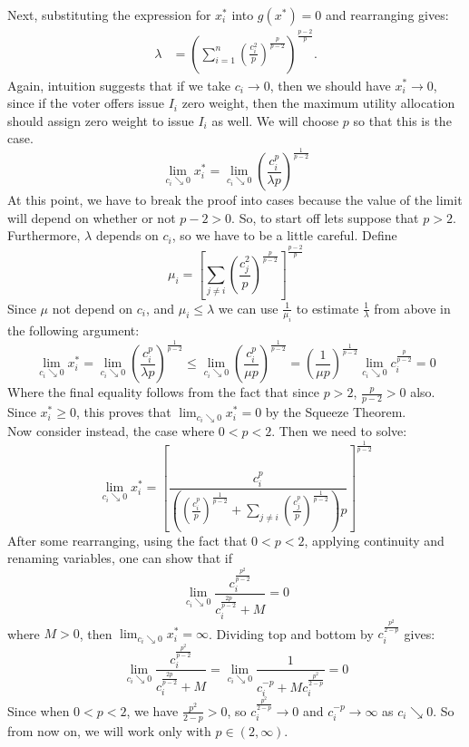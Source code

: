 \documentclass[
10pt, %
a4paper, %
oneside, %
headinclude,footinclude, %
BCOR5mm, %
]{scrartcl}
\theoremstyle{definition} %
\theoremstyle{plain} %
\theoremstyle{remark} %
\begin{document}
Next, substituting the expression for $x_i^\ast$ into $g(x^\ast) = 0$ and rearranging gives:
\begin{align*}
\lambda &= \left(\sum_{i=1}^n \left(\frac{c_i^2}{p}\right)^\frac{p}{p-2}\right)^\frac{p-2}{p}.
\end{align*}
Again, intuition suggests that if we take $c_i\to 0$, then we should have $x_i^\ast \to 0$, since if the voter offers issue $I_i$ zero weight, then the maximum utility allocation should assign zero weight to issue $I_i$ as well. We will choose $p$ so that this is the case.
$$\lim_{c_i \searrow 0} x_i^\ast = \lim_{c_i \searrow 0} \left(\frac{c_i^p}{\lambda p}\right)^{\frac{1}{p-2}}$$
At this point, we have to break the proof into cases because the value of the limit will depend on whether or not $p-2 > 0$. So, to start off lets suppose that $p > 2$. Furthermore, $\lambda$ depends on $c_i$, so we have to be a little careful. Define
$$\mu_i = \left[ \sum_{j\neq i} \left(\frac{c_j^2}{p}\right)^\frac{p}{p-2}\right]^\frac{p-2}{p}$$
Since $\mu$ not depend on $c_i$, and $\mu_i \leq \lambda$ we can use $\frac{1}{\mu_i}$ to estimate $\frac{1}{\lambda}$ from above in the following argument:
$$\lim_{c_i \searrow 0} x_i^\ast = \lim_{c_i \searrow 0} \left(\frac{c_i^p}{\lambda p}\right)^{\frac{1}{p-2}} \leq \lim_{c_i \searrow 0} \left(\frac{c_i^p}{\mu p}\right)^{\frac{1}{p-2}} = \left(\frac{1}{\mu p}\right)^\frac{1}{p-2}\lim_{c_i \searrow 0} c_i^{\frac{p}{p-2}} = 0$$
Where the final equality follows from the fact that since $p > 2$, $\frac{p}{p-2}>0$ also. Since $x_i^\ast \geq 0$, this proves that $\lim_{c_i \searrow 0} x_i^\ast = 0$ by the Squeeze Theorem. \\

Now consider instead, the case where $0<p<2$. Then we need to solve:
$$\lim_{c_i \searrow 0} x_i^\ast = \left[ \frac{c_i^p}{\left( \left(\frac{c_i^p}{p}\right)^\frac{1}{p-2} + \sum_{j\neq i}\left( \frac{c_j^p}{p}\right)^\frac{1}{p-2}\right) p} \right]^\frac{1}{p-2}$$
After some rearranging, using the fact that $0<p<2$, applying continuity and renaming variables, one can show that if
$$\lim_{c_i \searrow 0} \frac{c_i^\frac{p^2}{p-2}}{c_i^\frac{2p}{p-2} + M} = 0$$
where $M > 0$, then $\lim_{c_i \searrow 0} x_i^\ast = \infty$. Dividing top and bottom by $c_i^\frac{p^2}{2-p}$ gives:
$$\lim_{c_i \searrow 0} \frac{c_i^\frac{p^2}{p-2}}{c_i^\frac{2p}{p-2} + M}  = \lim_{c_i \searrow 0} \frac{1}{c_i^{-p} + M c_i^\frac{p^2}{2-p}} = 0$$
Since when $0 < p < 2$, we have $\frac{p^2}{2-p} > 0$, so $c_i^\frac{p^2}{2-p} \rightarrow 0$ and $c_i^{-p} \rightarrow \infty$ as $c_i \searrow 0$. So from now on, we will work only with $p\in(2,\infty)$.
\end{document}
